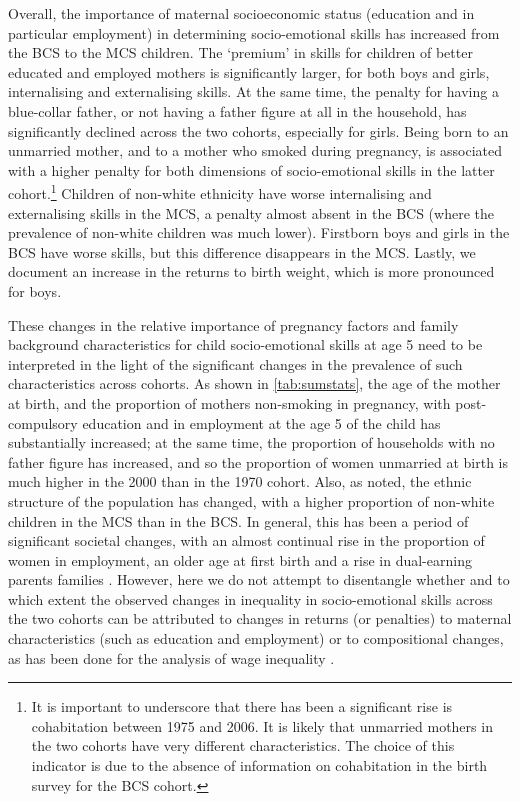 Overall, the importance of maternal socioeconomic status (education and in particular employment) in determining socio-emotional skills has increased from the BCS to the MCS children. The `premium' in skills for children of better educated and employed mothers is significantly larger, for both boys and girls, internalising and externalising skills. At the same time, the penalty for having a blue-collar father, or not having a father figure at all in the household, has significantly declined across the two cohorts, especially for girls. Being born to an unmarried mother, and to a mother who smoked during pregnancy, is associated with a higher penalty for both dimensions of socio-emotional skills in the latter cohort.\footnote{It is important to underscore that there has been a significant rise is cohabitation between 1975 and 2006. It is likely that unmarried mothers in the two cohorts have very different characteristics. The choice of this indicator is due to the absence of information on cohabitation in the birth survey for the BCS cohort.} Children of non-white ethnicity have worse internalising and externalising skills in the MCS, a penalty almost absent in the BCS (where the prevalence of non-white children was much lower). Firstborn boys and girls in the BCS have worse skills, but this difference disappears in the MCS. Lastly, we document an increase in the returns to birth weight, which is more pronounced for boys.

These changes in the relative importance of pregnancy factors and family background characteristics for child socio-emotional skills at age 5 need to be interpreted in the light of the significant changes in the prevalence of such characteristics across cohorts. As shown in \autoref{tab:sumstats}, the age of the mother at birth, and the proportion of mothers non-smoking in pregnancy, with post-compulsory education and in employment at the age 5 of the child has substantially increased; at the same time, the proportion of households with no father figure has increased, and so the proportion of women unmarried at birth is much higher in the 2000 than in the 1970 cohort. Also, as noted, the ethnic structure of the population has changed, with a higher proportion of non-white children in the MCS than in the BCS. In general, this has been a period of significant societal changes, with an almost continual rise in the proportion of women in employment, an older age at first birth and a rise in dual-earning parents families \citep{Roantree2018}. However, here we do not attempt to disentangle whether and to which extent the observed changes in inequality in socio-emotional skills across the two cohorts can be attributed to changes in returns (or penalties) to maternal characteristics (such as education and employment) or to compositional changes, as has been done for the analysis of wage inequality \citep{Blundell2007}.

